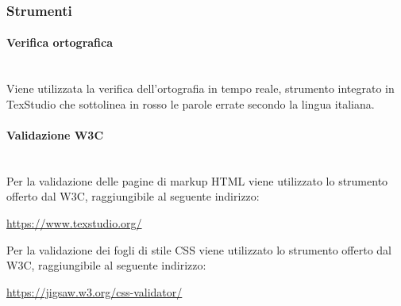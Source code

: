 		\subsubsection{Strumenti}
			\paragraph{Verifica ortografica} \mbox{}\\
			Viene utilizzata la verifica dell’ortografia in tempo reale, strumento integrato in TexStudio che sottolinea in rosso le parole errate secondo la lingua italiana.
			\paragraph{Validazione W3C} \mbox{}\\
			Per la validazione delle pagine di markup HTML viene utilizzato lo strumento offerto dal W3C, raggiungibile al seguente indirizzo: \newline
			\centerline{\url{https://www.texstudio.org/}} \newline
			Per la validazione dei fogli di stile CSS viene utilizzato lo strumento offerto dal W3C, raggiungibile al seguente indirizzo: \newline
			\centerline{\url{https://jigsaw.w3.org/css-validator/}} \newline
	